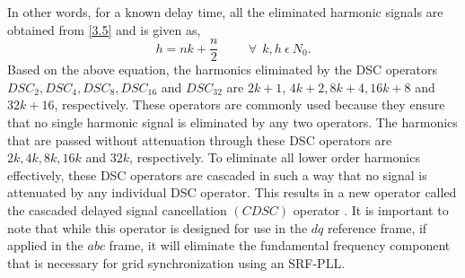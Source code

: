 \vspace*{-0.7cm}
In other words, for a known delay time, all the eliminated harmonic signals are obtained from \eqref{3.5} and is given as, \vspace*{-0.5cm}
\begin{equation*} \label{3.6}
h = nk + \frac{n}{2} \hspace{1cm} \forall ~~ k,h ~ \epsilon ~ N_{0}.
\end{equation*}
Based on the above equation, the harmonics eliminated by the DSC operators $DSC_{2}, DSC_{4}, DSC_{8}, DSC_{16} $ and $ DSC_{32} $ are $ 2k+1$, $4k+2, 8k+4, 16k+8 $ and $32k+16$, respectively. These operators are commonly used because they ensure that no single harmonic signal is eliminated by any two operators. The harmonics that are passed without attenuation through these DSC operators are $2k, 4k, 8k, 16k$ and $32k$, respectively. To eliminate all lower order harmonics effectively, these DSC operators are cascaded in such a way that no signal is attenuated by any individual DSC operator. This results in a new operator called the cascaded delayed signal cancellation $(CDSC)$ operator \cite{5624643,5668509,6249751,5959976,7081338,8624618}. It is important to note that while this operator is designed for use in the $dq$ reference frame, if applied in the $abc$ frame, it will eliminate the fundamental frequency component that is necessary for grid synchronization using an SRF-PLL. 
